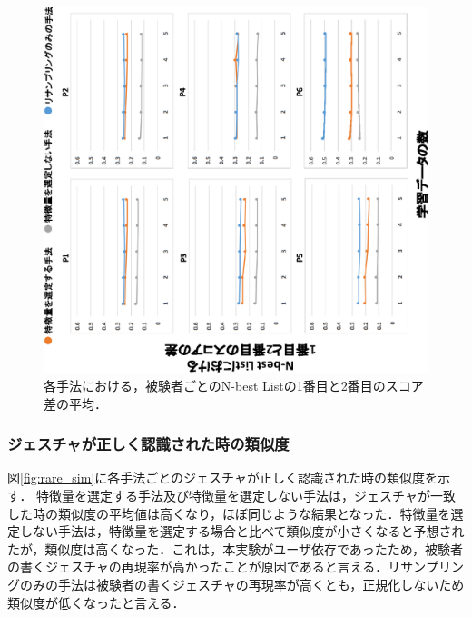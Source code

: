 \begin{figure}[!h]
\centering
\includegraphics[width=0.85\columnwidth,angle=-90]{img/pre_diff.eps}
\caption{各手法における，被験者ごとのN-best Listの1番目と2番目のスコア差の平均．}
\label{fig:rare_diff}
\end{figure}

\subsubsection{ジェスチャが正しく認識された時の類似度}
図\ref{fig:rare_sim}に各手法ごとのジェスチャが正しく認識された時の類似度を示す．
特徴量を選定する手法及び特徴量を選定しない手法は，ジェスチャが一致した時の類似度の平均値は高くなり，ほぼ同じような結果となった．特徴量を選定しない手法は，特徴量を選定する場合と比べて類似度が小さくなると予想されたが，類似度は高くなった．これは，本実験がユーザ依存であったため，被験者の書くジェスチャの再現率が高かったことが原因であると言える．リサンプリングのみの手法は被験者の書くジェスチャの再現率が高くとも，正規化しないため類似度が低くなったと言える．

